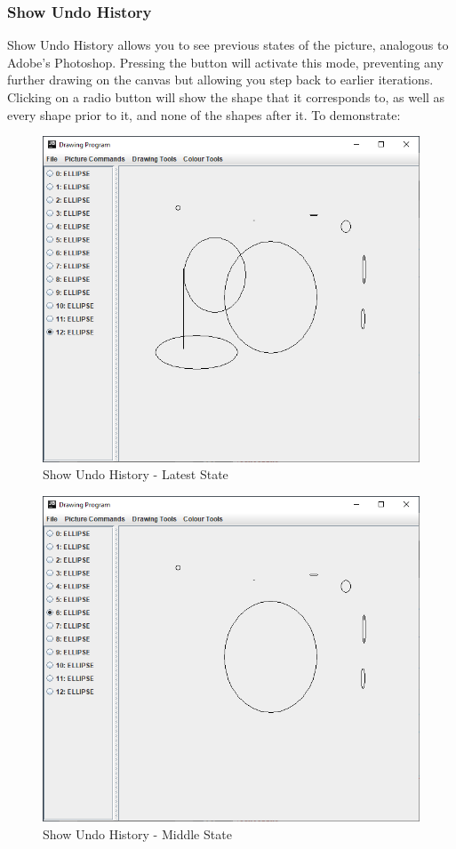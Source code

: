 \documentclass[12pt]{article} %
\begin{document}
\subsubsection{Show Undo History}
Show Undo History allows you to see previous states of the picture, analogous to Adobe's Photoshop. Pressing the button will activate this mode, preventing any further drawing on the canvas but allowing you step back to earlier iterations. Clicking on a radio button will show the shape that it corresponds to, as well as every shape prior to it, and none of the shapes after it. To demonstrate:

\begin{figure}[H]
\caption{Show Undo History - Latest State}
\centering
\includegraphics[scale=0.75]{pictures/showUndoFirstWindow.PNG}
\end{figure}

\begin{figure}[H]
\caption{Show Undo History - Middle State}
\centering
\includegraphics[scale=0.75]{pictures/showUndoSecondWindow.PNG}
\end{figure}
\end{document}
